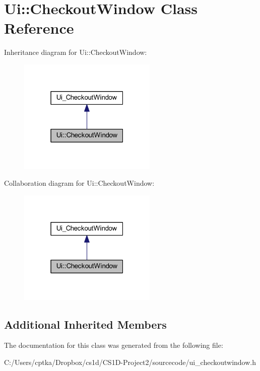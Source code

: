 \hypertarget{class_ui_1_1_checkout_window}{}\section{Ui\+:\+:Checkout\+Window Class Reference}
\label{class_ui_1_1_checkout_window}


Inheritance diagram for Ui\+:\+:Checkout\+Window\+:
\nopagebreak
\begin{figure}[H]
\begin{center}
\leavevmode
\includegraphics[width=187pt]{class_ui_1_1_checkout_window__inherit__graph}
\end{center}
\end{figure}


Collaboration diagram for Ui\+:\+:Checkout\+Window\+:
\nopagebreak
\begin{figure}[H]
\begin{center}
\leavevmode
\includegraphics[width=187pt]{class_ui_1_1_checkout_window__coll__graph}
\end{center}
\end{figure}
\subsection*{Additional Inherited Members}


The documentation for this class was generated from the following file\+:\begin{DoxyCompactItemize}
\item 
C\+:/\+Users/cptka/\+Dropbox/cs1d/\+C\+S1\+D-\/\+Project2/sourcecode/ui\+\_\+checkoutwindow.\+h\end{DoxyCompactItemize}
